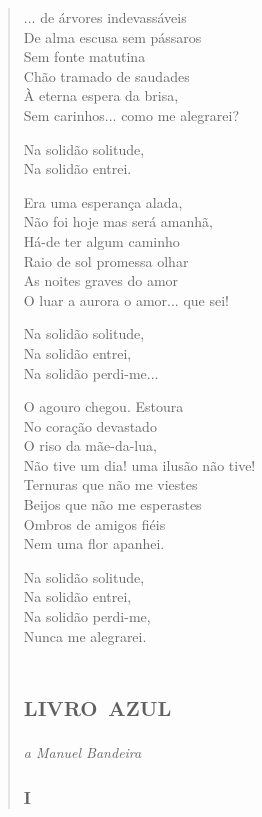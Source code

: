 

\begin{verse}
... de árvores indevassáveis\\
De alma escusa sem pássaros\\
Sem fonte matutina\\
Chão tramado de saudades\\
À eterna espera da brisa,\\
Sem carinhos... como me alegrarei?

Na solidão solitude,\\
Na solidão entrei.

Era uma esperança alada,\\
Não foi hoje mas será amanhã,\\
Há-de ter algum caminho\\
Raio de sol promessa olhar\\
As noites graves do amor\\
O luar a aurora o amor... que sei!

Na solidão solitude,\\
Na solidão entrei,\\
Na solidão perdi-me...

O agouro chegou. Estoura\\
No coração devastado\\
O riso da mãe-da-lua,\\
Não tive um dia! uma ilusão não tive!\\
Ternuras que não me viestes\\
Beijos que não me esperastes\\
Ombros de amigos fiéis\\
Nem uma flor apanhei.

Na solidão solitude,\\
Na solidão entrei,\\
Na solidão perdi-me,\\
Nunca me alegrarei.

\part{\textsc{livro azul}}


\begin{flushright}
\emph{a Manuel Bandeira}
\end{flushright}

\section{I}


\end{verse}
